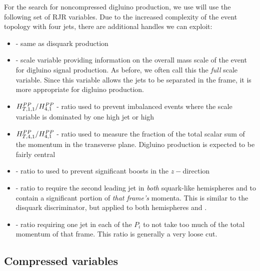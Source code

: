 For the search for noncompressed digluino production, we use will use the following set of RJR variables.
Due to the increased complexity of the event topology with four jets, there are additional handles we can exploit:
\begin{itemize}
\item {} - same as disquark production
\item {} - scale variable providing information on the overall mass scale of the event for digluino signal production.  As before, we often call this the \textit{full} scale variable.  Since this variable allows the jets to be separated in the \PP frame, it is more appropriate for digluino production.
\item $H^{{PP}}_{T,1,1}/H^{{PP}}_{4,1} $ - ratio used to prevent imbalanced events where the scale variable is dominated by one high \pT jet or high \met
\item $H^{{PP}}_{T,4,1}/H^{{PP}}_{4,1} $ - ratio used to measure the fraction of the total scalar sum of the momentum in the transverse plane.  Digluino production is expected to be fairly central
\item \pzlabratioFour - ratio to used to prevent significant boosts in the $z-$direction
\item \minjTwoGuy - ratio to require the second leading jet in \textit{both} squark-like hemispheres \Ca and \Cb to contain a significant portion of \textit{that frame's} momenta.  This is similar to the \ptjTworatio disquark discriminator, but applied to both hemispheres \Ca and \Cb.
\item \maxjTwoGuy - ratio requiring one jet in each of the $P_i$ to not take too much of the total momentum of that frame.  This ratio is generally a very loose cut.
\end{itemize}

\subsection{Compressed variables}


